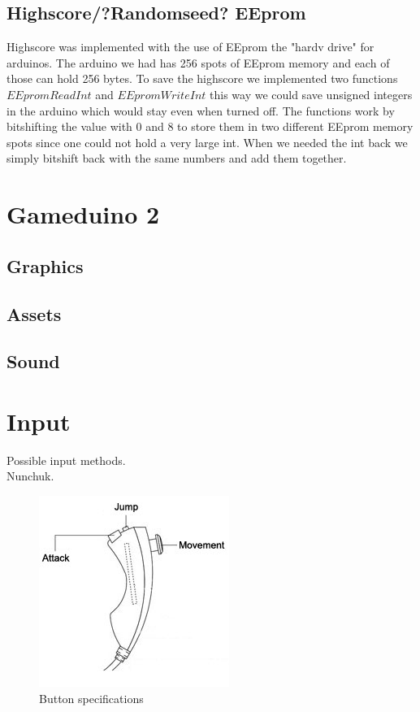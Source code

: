 \subsection{Highscore/?Randomseed? EEprom}
Highscore was implemented with the use of EEprom the "hardv drive" for arduinos. The arduino we had has 256 spots of EEprom memory and each of those can hold 256 bytes. To save the highscore we implemented two functions $EEpromReadInt$ and $EEpromWriteInt$ this way we could save unsigned integers in the arduino which would stay even when turned off. The functions work by bitshifting the value with 0 and 8 to store them in two different EEprom memory spots since one could not hold a very large int. When we needed the int back we simply bitshift back with the same numbers and add them together.



\section{Gameduino 2}
\subsection{Graphics}
\subsection{Assets}
\subsection{Sound}

\section{Input}
Possible input methods.\\
Nunchuk.

\begin{figure}[h] 
  \centering 
  \includegraphics[scale=0.6]{Figures/nunchuk}
  \caption{Button specifications} 
  \label{fig:Nunchuk} 
\end{figure}

